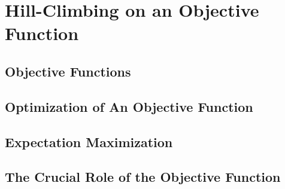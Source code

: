 \section{Hill-Climbing on an Objective Function}

\subsection{Objective Functions}
\subsection{Optimization of An Objective Function}
\subsection{Expectation Maximization}
\subsection{The Crucial Role of the Objective Function}